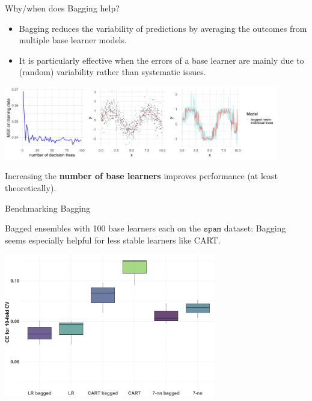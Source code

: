 \documentclass[11pt,compress,t,notes=noshow, xcolor=table]{beamer}
\begin{document}
\begin{vbframe}{Why/when does Bagging help?}

\begin{itemize}
  \item Bagging reduces the variability of predictions by averaging the outcomes from multiple base learner models. %

  \item It is particularly effective when the errors of a base learner are mainly due to (random) variability rather than systematic issues.
\end{itemize}

\begin{center}
\includegraphics[width=340pt]{figure/bagging-mean.png}
\end{center}

\begin{center}
\footnotesize{Increasing the \textbf{number of base learners} improves performance (at least theoretically).}
\end{center}

\end{vbframe}

\begin{vbframe}{Benchmarking Bagging}

Bagged ensembles with 100 base learners each on the $\texttt{spam}$ dataset: Bagging seems especially helpful for less stable learners like CART.

\begin{center}
\includegraphics[width=260pt]{figure/bagging-bench.png}
\end{center}

\end{vbframe}


\endlecture
\end{document}

